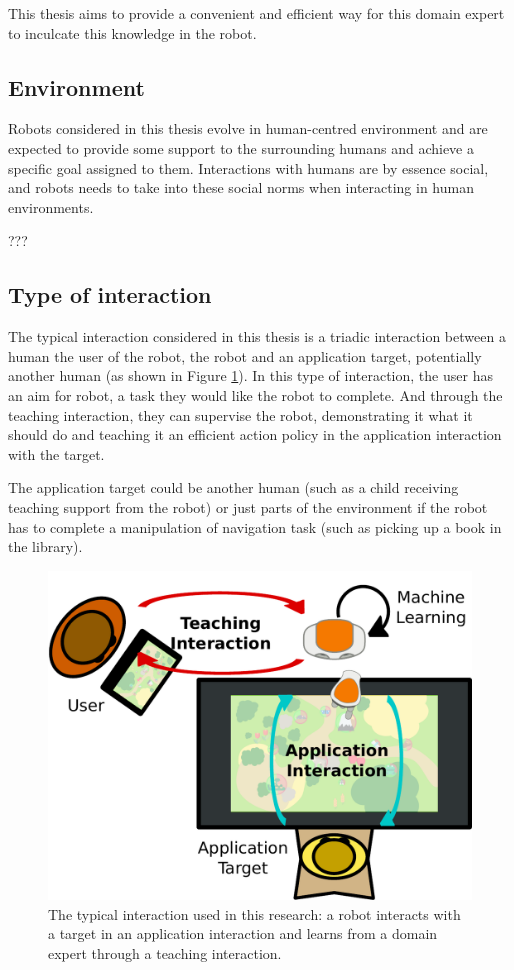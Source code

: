 This thesis aims to provide a convenient and efficient way for this domain expert to inculcate this knowledge in the robot.


\subsection{Environment} 

Robots considered in this thesis evolve in human-centred environment and are expected to provide some support to the surrounding humans and achieve a specific goal assigned to them. Interactions with humans are by essence social, and robots needs to take into these social norms when interacting in human environments.

???

\subsection{Type of interaction}

The typical interaction considered in this thesis is a triadic interaction between a human the user of the robot, the robot and an application target, potentially another human (as shown in Figure \ref{fig:intro_setup}). In this type of interaction, the user has an aim for robot, a task they would like the robot to complete. And through the teaching interaction, they can supervise the robot, demonstrating it what it should do and teaching it an efficient action policy in the application interaction with the target.

The application target could be another human (such as a child receiving teaching support from the robot) or just parts of the environment if the robot has to complete a manipulation of navigation task (such as picking up a book in the library).

\begin{figure}[ht]
	\includegraphics[width=.7\linewidth]{setup.pdf}
	\centering
	\caption{The typical interaction used in this research: a robot interacts with a target in an application interaction and learns from a domain expert through a teaching interaction.}
	\label{fig:intro_setup}
\end{figure}

